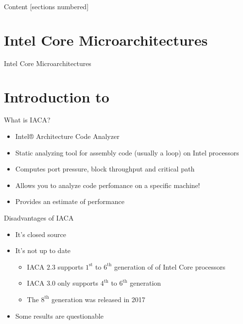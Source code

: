 \documentclass[10pt, tikz,border=2mm, xcolor=dvipsnames]{beamer}
\title{\suaca}
\subtitle{Bachelor talk}
\date{July 26, 2018}
\author{Hendrik Meerkamp}
\institute{}
\begin{document}
    
    \maketitle
    
\begin{frame}{Content}
    [sections numbered]
    \tableofcontents[hideallsubsections]
\end{frame}

\section{Intel Core Microarchitectures}

\begin{frame}{Intel Core Microarchitectures}
    
\end{frame}

\section{Introduction to \iaca}


\begin{frame}{What is IACA?}
\begin{itemize}[<+- | alert@+>]
    \item Intel® Architecture Code Analyzer
    \item Static analyzing tool for assembly code (usually a loop) on Intel processors
    \item Computes port pressure, block throughput and critical path
    \item Allows you to analyze code perfomance on a specific machine!
    \item Provides an estimate of performance
\end{itemize}
\end{frame}

\begin{frame}[fragile]{Disadvantages of IACA}
\begin{itemize}[<+- | alert@+>]
    \item It's closed source
    \item It's not up to date
    \begin{itemize}[<+- | alert@+>]
        \item IACA $2.3$ supports $1^{\text{st}}$ to $6^{\text{th}}$ generation of of Intel Core processors
        \item IACA $3.0$ only supports $4^{\text{th}}$ to $6^{\text{th}}$ generation
        \item The $8^{\text{th}}$ generation was released in 2017
    \end{itemize}
    \item Some results are questionable
\end{itemize}
\end{frame}
\end{document}
